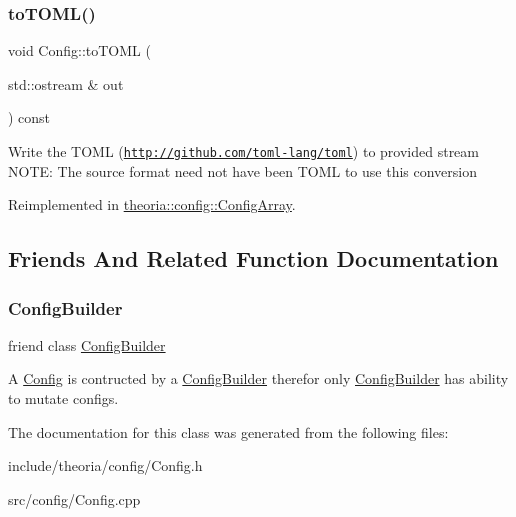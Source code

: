 \subsubsection{\texorpdfstring{to\+T\+O\+M\+L()}{toTOML()}}
{\footnotesize\ttfamily void Config\+::to\+T\+O\+ML (\begin{DoxyParamCaption}\item[{std\+::ostream \&}]{out }\end{DoxyParamCaption}) const\hspace{0.3cm}{\ttfamily [virtual]}}

Write the T\+O\+ML (\href{http://github.com/toml-lang/toml}{\tt http\+://github.\+com/toml-\/lang/toml}) to provided stream N\+O\+TE\+: The source format need not have been T\+O\+ML to use this conversion 

Reimplemented in \hyperlink{classtheoria_1_1config_1_1ConfigArray_a1c73dba526ebd747682bc961676f5158}{theoria\+::config\+::\+Config\+Array}.



\subsection{Friends And Related Function Documentation}
\mbox{\label{classtheoria_1_1config_1_1Config_a3d61732fded713b38fc7f9fe3d80e2ae}} 
\subsubsection{\texorpdfstring{Config\+Builder}{ConfigBuilder}}
{\footnotesize\ttfamily friend class \hyperlink{classtheoria_1_1config_1_1ConfigBuilder}{Config\+Builder}\hspace{0.3cm}{\ttfamily [friend]}}

A \hyperlink{classtheoria_1_1config_1_1Config}{Config} is contructed by a \hyperlink{classtheoria_1_1config_1_1ConfigBuilder}{Config\+Builder} therefor only \hyperlink{classtheoria_1_1config_1_1ConfigBuilder}{Config\+Builder} has ability to mutate configs. 

The documentation for this class was generated from the following files\+:\begin{DoxyCompactItemize}
\item 
include/theoria/config/Config.\+h\item 
src/config/Config.\+cpp\end{DoxyCompactItemize}
